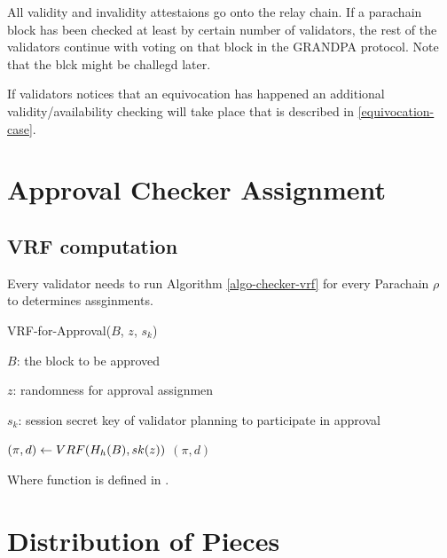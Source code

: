 All validity and invalidity attestaions go onto the relay chain. If a parachain block has been checked at least by certain number of validators, the rest of the validators continue with voting on that block in the GRANDPA protocol. Note that the blck might be challegd later. 
	 
If validators notices that an equivocation has happened an additional validity/availability checking will take place that is described in \ref{equivocation-case}. 
  
\section{Approval Checker Assignment}
\subsection{VRF computation}

Every validator needs to run Algorithm \ref{algo-checker-vrf} for every Parachain $\rho$ to determines assginments.

\begin{algorithm}
  \caption[VRF-for-Approval]{\sc VRF-for-Approval($B$, $z$, $s_k$)}
  \label{algo-checker-vrf}
  \begin{algorithmic}[1]
  \Require

    $B$: the block to be approved 

    $z$: randomness for approval assignmen

    $s_k$: session secret key of validator planning to participate in approval

    \State $(\pi, d) \leftarrow \sc{VRF}(H_h(B),sk(z))$
    \State \Return $(\pi,d)$
  \end{algorithmic}
\end{algorithm}

\begin{algorithm}
  \Require{}
  \caption[]{\sc }
  \begin{algorithmic}[1]
    \State
  \end{algorithmic}
\end{algorithm}

Where  function is defined in \cite{polkadot-crypto-spec}.

\section{Distribution of Pieces}\label{distribute-piece}

